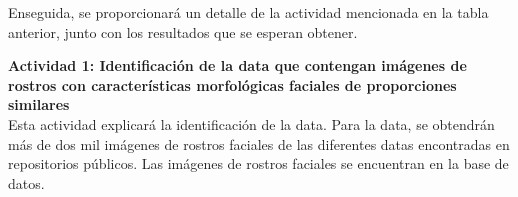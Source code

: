 






 
 
 Enseguida, se proporcionará un detalle de la actividad mencionada en la tabla anterior, junto con los resultados que se esperan obtener.
 
 \textbf{Actividad 1: Identificación de la data que contengan imágenes de rostros con características morfológicas faciales de proporciones similares}
 \\
 Esta actividad explicará la identificación de la data. Para la data, se obtendrán más de dos mil imágenes de rostros faciales de las diferentes datas encontradas en repositorios públicos. Las imágenes de rostros faciales se encuentran en la base de datos. 
 
